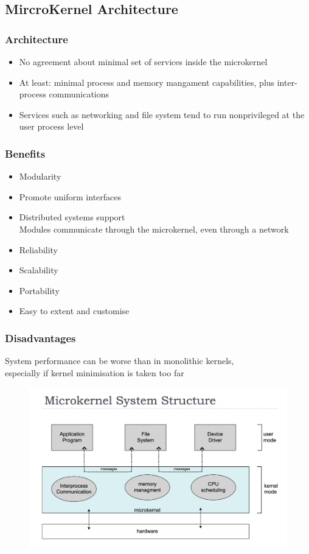\documentclass[11pt]{article}
\theoremstyle{definition}
\begin{document}
        \subsection{MircroKernel Architecture}
            \subsubsection{Architecture}
                \begin{itemize}
                    \item No agreement about minimal set of services inside the microkernel
                    \item At least: minimal process and memory mangament capabilities, plus inter-process communications
                    \item Services such as networking and file system tend to run nonprivileged at the user process level
                \end{itemize}
             \subsubsection{Benefits}
                \begin{itemize}
                    \item Modularity
                    \item Promote uniform interfaces
                    \item Distributed systems support \\
                        \hspace{1cm} Modules communicate through the microkernel, even through a network
                    \item Reliability
                    \item Scalability
                    \item Portability
                    \item Easy to extent and customise
                \end{itemize}
            \subsubsection{Disadvantages}
                System performance can be worse than in monolithic kernels, \\especially if kernel minimisation is taken too far
             \begin{figure}[htbp]
                \centering
                \includegraphics[width=0.65\linewidth]{img/microkernel.jpg}
                \label{fig:enter-label}
            \end{figure}
\end{document}
